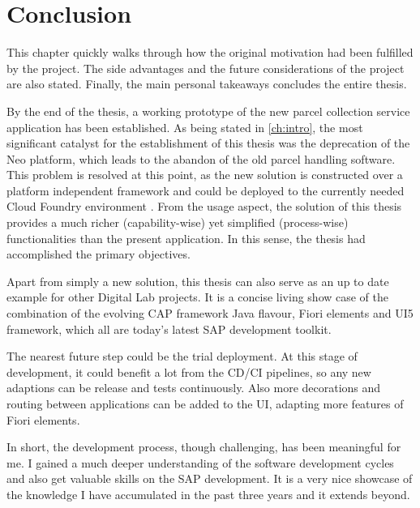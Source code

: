 \chapter*{Conclusion}
\label{ch:sum}


This chapter quickly walks through how the original motivation had been fulfilled by the project. The side advantages and the future considerations of the project are also stated. Finally, the main personal takeaways concludes the entire thesis.

By the end of the thesis, a working prototype of the new parcel collection service application has been established.
As being stated in \autoref{ch:intro}, the most significant catalyst for the establishment of this thesis was the deprecation of the Neo platform, which leads to the abandon of the old parcel handling software. This problem is resolved at this point, as the new solution is constructed over a platform independent framework and could be deployed to the currently needed Cloud Foundry environment \cite{cf}. From the usage aspect, the solution of this thesis provides a much richer (capability-wise) yet simplified (process-wise) functionalities than the present application. In this sense, the thesis had accomplished the primary objectives.

Apart from simply a new solution, this thesis can also serve as an up to date example for other Digital Lab projects. It is a concise living show case of the combination of the evolving CAP framework Java flavour, Fiori elements and UI5 framework, which all are today's latest SAP development toolkit. 

The nearest future step could be the trial deployment. At this stage of development, it could benefit a lot from the CD/CI \cite{cdci} pipelines, so any new adaptions can be release and tests continuously. Also more decorations and routing between applications can be added to the UI, adapting more features of Fiori elements.

In short, the development process, though challenging, has been meaningful for me. I gained a much deeper understanding of the software development cycles and also get valuable skills on the SAP development. It is a very nice showcase of the knowledge I have accumulated in the past three years and it extends beyond.
